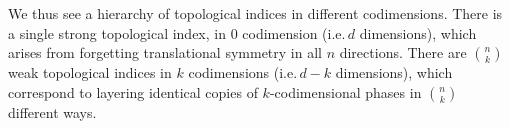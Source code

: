 \documentclass[sort&compress]{elsarticle}
\theoremstyle{theoremstyle}
\theoremstyle{framedtheoremstyle}
\theoremstyle{definitionstyle}
\theoremstyle{definitionstyle}
\theoremstyle{definitionstyle}
\theoremstyle{definitionstyle}
\theoremstyle{nameddefinitionstyle}
\theoremstyle{framednameddefinitionstyle}
\theoremstyle{proofstyle}
\theoremstyle{definitionstyle}
\newcommand{\ZZZ}{\mathbb{Z}}
\begin{document}
We thus see a hierarchy of topological indices in different codimensions. There is a single strong topological index, in $0$ codimension (i.e.\,$d$ dimensions), which arises from forgetting translational symmetry in all $n$ directions. There are $n \choose k$ weak topological indices in $k$ codimensions (i.e.\,$d-k$ dimensions), which correspond to layering identical copies of $k$-codimensional phases in $n \choose k$ different ways.

\end{document}
